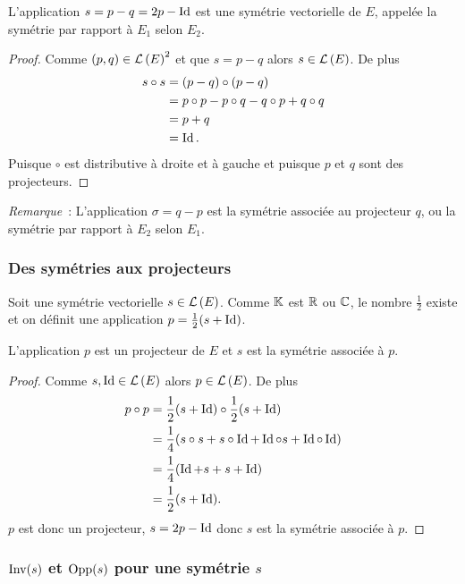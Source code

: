 \begin{prop}
  L'application \(s=p-q=2p-\operatorname{Id}\) est une symétrie vectorielle de \(E\), appelée la symétrie par rapport à \(E_1\) selon \(E_2\).
\end{prop}
\begin{proof}
  Comme \((p,q) \in \mathcal{L}\left(E\right)^2\) et que \(s=p-q\) alors \(s \in \mathcal{L}\left(E\right)\). De plus
  \begin{align}
    s \circ s &=(p-q) \circ (p-q)\\
              &=p \circ p -p \circ q -q \circ p +q \circ q\\
              &=p+q\\
              &=\operatorname{Id}.
  \end{align}
  Puisque \(\circ\) est distributive à droite et à gauche et puisque \(p\) et \(q\) sont des projecteurs.
\end{proof}

\emph{Remarque}~: L'application \(\sigma=q-p\) est la symétrie associée au projecteur \(q\), ou la symétrie par rapport à \(E_2\) selon \(E_1\).

\subsubsection{Des symétries aux projecteurs}

Soit une symétrie vectorielle \(s \in \mathcal{L}\left(E\right)\). Comme \(\mathbb{K}\) est \(\mathbb{R}\) ou \(\mathbb{C}\), le nombre \(\frac{1}{2}\) existe et on définit une application \(p = \frac{1}{2}(s+\operatorname{Id})\).

\begin{prop}
  L'application \(p\) est un projecteur de \(E\) et \(s\) est la symétrie associée à \(p\).
\end{prop}
\begin{proof}
  Comme \(s, \operatorname{Id} \in \mathcal{L}\left(E\right)\) alors \(p \in \mathcal{L}\left(E\right)\). De plus
  \begin{align}
    p \circ p &= \frac{1}{2}(s+\operatorname{Id}) \circ \frac{1}{2}(s+\operatorname{Id}) \\
              &=\frac{1}{4}(s \circ s + s\circ \operatorname{Id} +\operatorname{Id} \circ s +\operatorname{Id} \circ \operatorname{Id})\\
              &=\frac{1}{4}(\operatorname{Id} +s +s+\operatorname{Id})\\
              &=\frac{1}{2}(s+\operatorname{Id}).
  \end{align}
  \(p\) est donc un projecteur, \(s=2p-\operatorname{Id}\) donc \(s\) est la symétrie associée à \(p\).
\end{proof}

\subsubsection{\(\operatorname{Inv}(s)\) et \(\operatorname{Opp}(s)\) pour une symétrie \(s\)}


